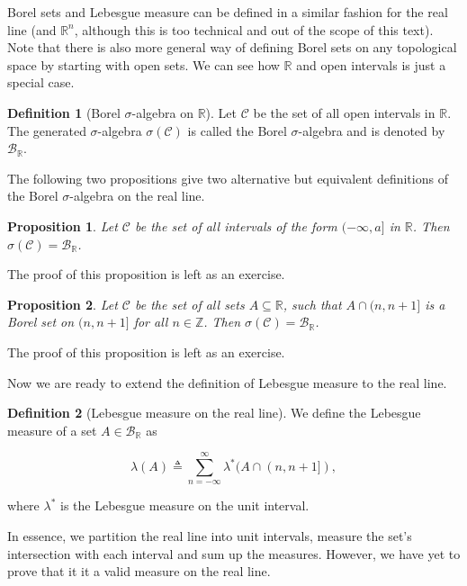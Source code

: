 \documentclass{book}
\theoremstyle{plain}%
\newtheorem{proposition}{Proposition}[section]
\theoremstyle{definition}
\newtheorem{definition}{Definition}[section]
\begin{document}
Borel sets and Lebesgue measure can be defined in a similar fashion for the real line (and $\mathbb{R}^n$, although this is too technical and out of the scope of this text). Note that there is also more general way of defining Borel sets on any topological space by starting with open sets. We can see how $\mathbb{R}$ and open intervals is just a special case.

\begin{definition}[Borel $\sigma$-algebra on $\mathbb{R}$] Let $\mathcal{C}$ be the set of all open intervals in $\mathbb{R}$.  The generated $\sigma$-algebra $\sigma(\mathcal{C})$  is called the Borel $\sigma$-algebra and is denoted by $\mathcal{B}_\mathbb{R}$.
\end{definition}

The following two propositions give two alternative but equivalent definitions of the Borel $\sigma$-algebra on the real line.

\begin{proposition}
Let $\mathcal{C}$ be the set of all intervals of the form $(-\infty, a]$ in $\mathbb{R}$. Then $\sigma(\mathcal{C}) = \mathcal{B}_\mathbb{R}$.\label{prop:borel1}
\end{proposition}

The proof of this proposition is left as an exercise.

\begin{proposition}
Let $\mathcal{C}$ be the set of all sets $A \subseteq \mathbb{R}$, such that $A \cap (n, n + 1]$ is a Borel set on $(n, n + 1]$ for all $n \in \mathbb{Z}$. Then $\sigma(\mathcal{C}) = \mathcal{B}_\mathbb{R}$.\label{prop:borel2}
\end{proposition}

The proof of this proposition is left as an exercise.

Now we are ready to extend the definition of Lebesgue measure to the real line.

\begin{definition}[Lebesgue measure on the real line] We define the Lebesgue measure of a set $A \in \mathcal{B}_\mathbb{R}$ as

$$\lambda(A) \triangleq \sum_{n = -\infty}^\infty \lambda^*(A \cap (n, n+1]),$$

where $\lambda^*$ is the Lebesgue measure on the unit interval.
\end{definition}

In essence, we partition the real line into unit intervals, measure the set's intersection with each interval and sum up the measures. However, we have yet to prove that it it a valid measure on the real line.
\end{document}
